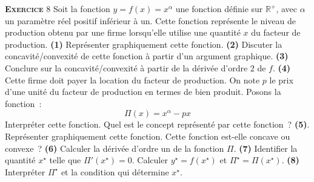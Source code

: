 \documentclass[10pt,a4paper,notitlepage]{article}
\newcommand{\exercice}[1]{\textsc{\textbf{Exercice}} #1}
\begin{document}
\exercice{8} Soit la fonction $y = f(x) = x^{\alpha}$ une fonction définie
sur $\mathbb R^+$, avec $\alpha$ un paramètre réel positif inférieur à
un. Cette fonction représente le niveau de production
obtenu par une firme lorsqu'elle utilise une quantité $x$ du facteur
de production. \textbf{(1)} Représenter graphiquement cette
fonction. \textbf{(2)} Discuter la concavité/convexité de cette
fonction à partir d'un argument graphique. \textbf{(3)} Conclure sur
la concavité/convexité à partir de la dérivée d'ordre 2 de
$f$. \textbf{(4)} Cette firme doit payer la location du facteur de
production. On note $p$ le prix d'une unité du facteur de
production en termes de bien produit. Posons la fonction :
\[
\Pi(x) = x^{\alpha} - p x
\]
Interpréter cette fonction. Quel est le concept représenté par cette
fonction ? \textbf{(5)}. Représenter graphiquement cette fonction. Cette fonction est-elle concave ou convexe ?
\textbf{(6)} Calculer la dérivée d'ordre un de la fonction
$\Pi$. \textbf{(7)} Identifier la quantité $x^{\star}$ telle que
$\Pi'(x^{\star}) = 0$. Calculer $y^{\star}=f(x^{\star})$ et
$\Pi^{\star} = \Pi(x^{\star})$. \textbf{(8)} Interpréter $\Pi^{\star}$
et la condition qui détermine $x^{\star}$.
\end{document}
